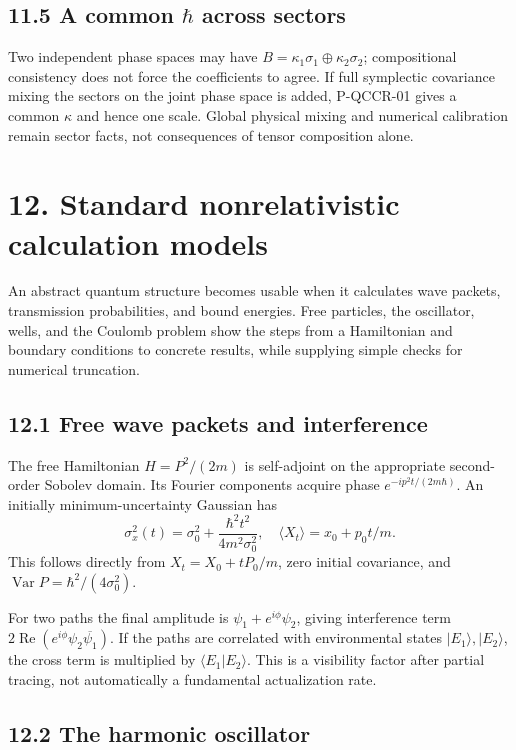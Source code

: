 \documentclass[
  11pt,
  oneside]{book}
\begin{document}
\section{\texorpdfstring{11.5 A common \(\hbar\) across
sectors}{11.5 A common \textbackslash hbar across sectors}}

Two independent phase spaces may have
\(B=\kappa_1\sigma_1\oplus\kappa_2\sigma_2\); compositional consistency
does not force the coefficients to agree. If full symplectic covariance
mixing the sectors on the joint phase space is added, P-QCCR-01 gives a
common \(\kappa\) and hence one scale. Global physical mixing and
numerical calibration remain sector facts, not consequences of tensor
composition alone.

\chapter{12. Standard nonrelativistic calculation models}\label{ch-12}

An abstract quantum structure becomes usable when it calculates wave
packets, transmission probabilities, and bound energies. Free particles,
the oscillator, wells, and the Coulomb problem show the steps from a
Hamiltonian and boundary conditions to concrete results, while supplying
simple checks for numerical truncation.

\section{12.1 Free wave packets and interference}

The free Hamiltonian \(H=P^2/(2m)\) is self-adjoint on the appropriate
second-order Sobolev domain. Its Fourier components acquire phase
\(e^{-ip^2t/(2m\hbar)}\). An initially minimum-uncertainty Gaussian has
\[
\sigma_x^2(t)=\sigma_0^2+\frac{\hbar^2t^2}{4m^2\sigma_0^2},
\quad \langle X_t\rangle=x_0+p_0t/m.
\] This follows directly from \(X_t=X_0+tP_0/m\), zero initial
covariance, and \(\operatorname{Var}P=\hbar^2/(4\sigma_0^2)\).

For two paths the final amplitude is \(\psi_1+e^{i\phi}\psi_2\), giving
interference term
\(2\operatorname{Re}(e^{i\phi}\psi_2\overline{\psi_1})\). If the paths
are correlated with environmental states \(|E_1\rangle,|E_2\rangle\),
the cross term is multiplied by \(\langle E_1|E_2\rangle\). This is a
visibility factor after partial tracing, not automatically a fundamental
actualization rate.

\section{12.2 The harmonic oscillator}
\end{document}
